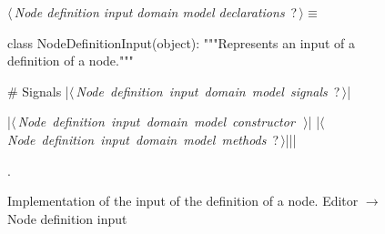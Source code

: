 \documentclass[%
    a4paper,    %
    justified,  %
    nobib,      %
    openany     %
]{tufte-book}
\makeatletter
\renewcommand{\label}[1]{\@tufte@label{##1}}%
\makeatother
\begin{document}
\begin{figure}
\begin{flushleft} \small
\begin{minipage}{\linewidth}\label{scrap134}\raggedright\small
{} $\langle\,${\itshape Node definition input domain model declarations}\nobreak\ {\footnotesize {?}}$\,\rangle\equiv$
\vspace{-1ex}
\begin{pythoncode}
class NodeDefinitionInput(object):
    """Represents an input of a definition of a node."""

    # Signals
    |\hbox{$\langle\,${\itshape Node definition input domain model signals}\nobreak\ {\footnotesize ?}$\,\rangle$}|

    |\hbox{$\langle\,${\itshape Node definition input domain model constructor}\nobreak\ {\footnotesize {}}$\,\rangle$}|
    |\hbox{$\langle\,${\itshape Node definition input domain model methods}\nobreak\ {\footnotesize ?}$\,\rangle$}||\NWsep|
\end{pythoncode}
\vspace{1.5ex}
\footnotesize
\begin{list}{}{\setlength{\itemsep}{-\parsep}\setlength{\itemindent}{-\leftmargin}}
\item {\NWtxtMacroNoRef}.

\item{}
\end{list}
\end{minipage}\vspace{4ex}
\end{flushleft}
\caption{Implementation of the input of the definition of a node.
  \newline{}\newline{}Editor $\rightarrow$ Node definition input}
\label{editor:lst:node-definition-input}
\end{figure}
\end{document}
